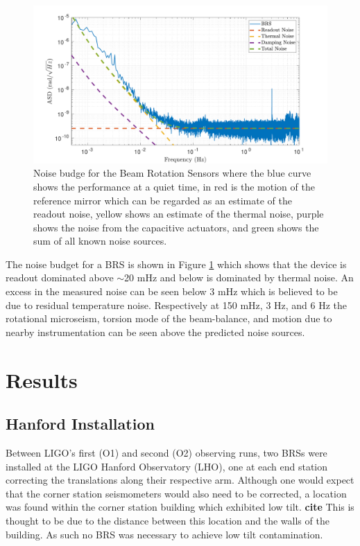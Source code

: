 \documentclass [12pt, proquest]{uwthesis}[2019]
\begin{document}
 \begin{figure}%
\begin{center}
\includegraphics[width=\textwidth]{BRSNoiseBudget2.pdf}
\caption{Noise budge for the Beam Rotation Sensors where the blue curve shows the performance at a quiet time, in red is the motion of the reference mirror which can be regarded as an estimate of the readout noise, yellow shows an estimate of the thermal noise, purple shows the noise from the capacitive actuators, and green shows the sum of all known noise sources.}
\label{noise}
\end{center}
\end{figure}

 The noise budget for a BRS is shown in Figure \ref{noise} which shows that the device is readout dominated above $\sim$20 mHz and below is dominated by thermal noise. An excess in the measured noise can be seen below 3 mHz which is believed to be due to residual temperature noise. Respectively at 150 mHz, 3 Hz, and 6 Hz the rotational microseism, torsion mode of the beam-balance, and motion due to nearby instrumentation can be seen above the predicted noise sources.

\section{Results}\label{results}
\subsection{Hanford Installation} \label{BRS_Hanford}

\quad Between LIGO's first (O1) and second (O2) observing runs, two BRSs were installed at the LIGO Hanford Observatory (LHO), one at each end station correcting the translations along their respective arm. Although one would expect that the corner station seismometers would also need to be corrected, a location was found within the corner station building which exhibited low tilt. \textbf{cite} This is thought to be due to the distance between this location and the walls of the building. As such no BRS was necessary to achieve low tilt contamination.
\end{document}
